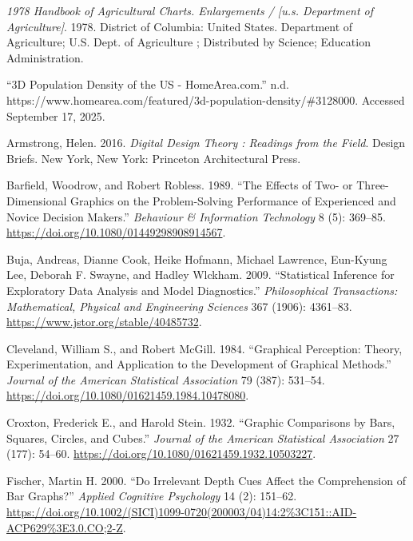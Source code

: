 \documentclass[phd]{nuthesis}
\begin{document}
\label{refs}
\begin{CSLReferences}{1}{0}
\emph{1978 Handbook of Agricultural Charts. Enlargements / {[}u.s.
Department of Agriculture{]}}. 1978. District of Columbia: United
States. Department of Agriculture; U.S. Dept. of Agriculture ;
Distributed by Science; Education Administration.

{``{3D Population Density} of the {US} - {HomeArea}.com.''} n.d.
https://www.homearea.com/featured/3d-population-density/\#3128000.
Accessed September 17, 2025.

Armstrong, Helen. 2016. \emph{Digital Design Theory : Readings from the
Field}. Design Briefs. New York, New York: Princeton Architectural
Press.

Barfield, Woodrow, and Robert Robless. 1989. {``The Effects of Two- or
Three-Dimensional Graphics on the Problem-Solving Performance of
Experienced and Novice Decision Makers.''} \emph{Behaviour \&
Information Technology} 8 (5): 369--85.
\url{https://doi.org/10.1080/01449298908914567}.

Buja, Andreas, Dianne Cook, Heike Hofmann, Michael Lawrence, Eun-Kyung
Lee, Deborah F. Swayne, and Hadley Wlckham. 2009. {``Statistical
Inference for Exploratory Data Analysis and Model Diagnostics.''}
\emph{Philosophical Transactions: Mathematical, Physical and Engineering
Sciences} 367 (1906): 4361--83.
\url{https://www.jstor.org/stable/40485732}.

Cleveland, William S., and Robert McGill. 1984. {``Graphical Perception:
Theory, Experimentation, and Application to the Development of Graphical
Methods.''} \emph{Journal of the American Statistical Association} 79
(387): 531--54. \url{https://doi.org/10.1080/01621459.1984.10478080}.

Croxton, Frederick E., and Harold Stein. 1932. {``Graphic Comparisons by
Bars, Squares, Circles, and Cubes.''} \emph{Journal of the American
Statistical Association} 27 (177): 54--60.
\url{https://doi.org/10.1080/01621459.1932.10503227}.

Fischer, Martin H. 2000. {``Do Irrelevant Depth Cues Affect the
Comprehension of Bar Graphs?''} \emph{Applied Cognitive Psychology} 14
(2): 151--62.
\url{https://doi.org/10.1002/(SICI)1099-0720(200003/04)14:2\%3C151::AID-ACP629\%3E3.0.CO;2-Z}.


\end{CSLReferences}
\end{document}
